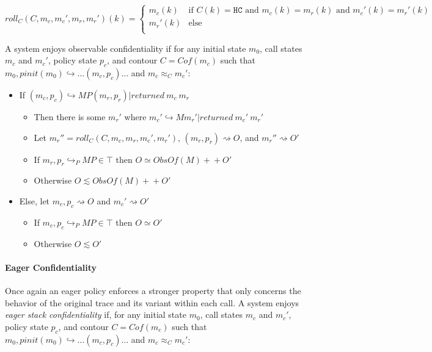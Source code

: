 \documentclass{article}
\begin{document}
      \[\mathit{roll}_C(C,m_c,m_c',m_r,m_r')(k) =
        \begin{cases}
          m_c(k) & \text{if } C(k) = \mathtt{HC} \text{ and } m_c(k) = m_r(k) \text{ and } m_c'(k) = m_r'(k) \\
          m_r'(k) & \text{else} \\
        \end{cases}\]

      A system enjoys observable confidentiality if for any initial state \(m_0\), call states \(m_c\)
      and \(m_c'\), policy state \(p_c\), and contour \(C = Cof(m_c)\) such that \(m_0,\mathit{pinit}(m_0)
      \hookrightarrow \dots (m_c,p_c) \dots\) and \(m_c \approx_C m_c'\):

      \begin{itemize}
        \item If \((m_c,p_c) \hookrightarrow MP (m_r,p_r) | \mathit{returned}\ m_c\ m_r\)
          \begin{itemize}
            \item Then there is some \(m_r'\) where
              \(m_c' \hookrightarrow M m_r' | \mathit{returned}\ m_c'\ m_r'\)
            \item Let \(m_r'' = \mathit{roll}_C(C,m_c,m_r,m_c',m_r')\),
              \((m_r,p_r) \rightsquigarrow O\), and \(m_r'' \rightsquigarrow O'\)
            \item If \(m_r,p_r \hookrightarrow_P MP \in \top\) then \(O \simeq \mathit{ObsOf}(M) +\!\!\!+ O'\)
            \item Otherwise \(O \lesssim \mathit{ObsOf}(M) +\!\!\!+ O'\)
          \end{itemize}
        \item Else, let \(m_c,p_c \rightsquigarrow O\) and \(m_c' \rightsquigarrow O'\)
          \begin{itemize}
            \item If \(m_c,p_c \hookrightarrow_P MP \in \top\) then \(O \simeq O'\)
            \item Otherwise \(O \lesssim O'\)
          \end{itemize}
      \end{itemize}

    \paragraph{Eager Confidentiality}

      Once again an eager policy enforces a stronger property that only concerns the behavior of
      the original trace and its variant within each call. A system enjoys {\it eager stack
      confidentiality} if, for any initial state \(m_0\), call states \(m_c\) and \(m_c'\),
      policy state \(p_c\), and contour \(C = Cof(m_c)\) such that \(m_0,\mathit{pinit}(m_0) \hookrightarrow
      \dots (m_c,p_c) \dots\) and \(m_c \approx_C m_c'\):
\end{document}
